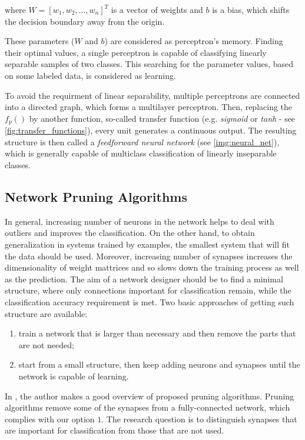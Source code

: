 where $ W = [w_1, w_2, ..., w_n]^T $ is a vector of weights and $ b $ is a bias, which shifts the decision boundary away from the origin.

These parameters ($ W $ and $ b $) are considered as perceptron's memory. Finding their optimal values, a single perceptron is capable of classifying linearly separable samples of two classes. This searching for the parameter values, based on some labeled data, is considered as learning.

To avoid the requirment of linear separability, multiple perceptrons are connected into a directed graph, which forms a multilayer perceptron. Then, replacing the $ f_p() $ by another function, so-called transfer function (e.g. \textit{sigmoid} or \textit{tanh} - see \cref{fig:transfer_functions}), every unit generates a continuous output. The resulting structure is then called a \textit{feedforward neural network} (see \cref{img:neural_net}), which is generally capable of multiclass classification of linearly inseparable classes.

\subsection*{Network Pruning Algorithms} \label{sec:soa_pruning_algorithms}
In general, increasing number of neurons in the network helps to deal with outliers and improves the classification. On the other hand, to obtain generalization in systems trained by examples, the smallest system that will fit the data should be used. Moreover, increasing number of synapses increases the dimensionality of weight mattrices and so slows down the training process as well as the prediction. The aim of a network designer should be to find a minimal structure, where only connections important for classification remain, while the classification accuracy requirement is met. Two basic approaches of getting such structure are available:

\begin{enumerate}
\item train a network that is larger than necessary and then remove the parts that are not needed;
\item start from a small structure, then keep adding neurons and synapses until the network is capable of learning.
\end{enumerate}

In \citep{article:10:pa}, the author makes a good overview of proposed pruning algorithms. Pruning algorithms remove some of the synapses from a fully-connected network, which complies with our option $ 1 $. The research question is to distinguish synapses that are important for classification from those that are not used.

